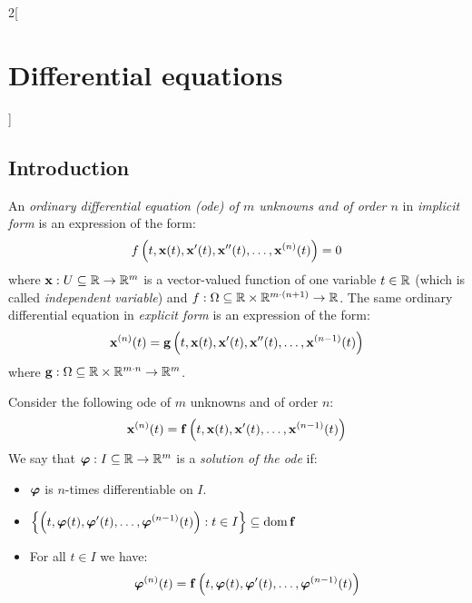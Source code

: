 \documentclass[../../../main.tex]{subfiles}
\begin{document}
\begin{multicols}{2}[\section{Differential equations}]
  \subsection{Introduction}
  \begin{definition}
    An \textit{ordinary differential equation (ode) of $m$ unknowns and of order $n$} in \textit{implicit form} is an expression of the form: $$f\left(t,\boldsymbol{\mathrm{x}}(t),\boldsymbol{\mathrm{x}}'(t),\boldsymbol{\mathrm{x}}''(t),\ldots,\boldsymbol{\mathrm{x}}^{(n)}(t)\right)=0$$
    where $\boldsymbol{\mathrm{x}}:U\subseteq\mathbb{R}\rightarrow\mathbb{R}^m$ is a vector-valued function of one variable $t\in\mathbb{R}$ (which is called \textit{independent variable}) and $f:\Omega\subseteq\mathbb{R}\times\mathbb{R}^{m\cdot(n+1)}\rightarrow\mathbb{R}$. The same ordinary differential equation in \textit{explicit form} is an expression of the form: $$\boldsymbol{\mathrm{x}}^{(n)}(t)=\boldsymbol{\mathrm{g}}\left(t,\boldsymbol{\mathrm{x}}(t),\boldsymbol{\mathrm{x}}'(t),\boldsymbol{\mathrm{x}}''(t),\ldots,\boldsymbol{\mathrm{x}}^{(n-1)}(t)\right)$$
    where $\boldsymbol{\mathrm{g}}:\Omega\subseteq\mathbb{R}\times\mathbb{R}^{m\cdot n}\rightarrow\mathbb{R}^m$.
  \end{definition}
  \begin{definition}
    Consider the following ode of $m$ unknowns and of order $n$:
    \begin{equation}\label{DE_ode1}
      \boldsymbol{\mathrm{x}}^{(n)}(t)=\boldsymbol{\mathrm{f}}\left(t,\boldsymbol{\mathrm{x}}(t),\boldsymbol{\mathrm{x}}'(t),\ldots,\boldsymbol{\mathrm{x}}^{(n-1)}(t)\right)
    \end{equation}
    We say that $\boldsymbol{\mathrm{\varphi}}:I\subseteq\mathbb{R}\rightarrow\mathbb{R}^m$ is a \textit{solution of the ode} if:
    \begin{itemize}
      \item $\boldsymbol{\mathrm{\varphi}}$ is $n$-times differentiable on $I$.
      \item $\displaystyle\left\{\left(t,\boldsymbol{\mathrm{\varphi}}(t),\boldsymbol{\mathrm{\varphi}}'(t),\ldots,\boldsymbol{\mathrm{\varphi}}^{(n-1)}(t)\right):t\in I\right\}\subseteq\operatorname{dom} \boldsymbol{\mathrm{f}}$
      \item For all $t\in I$ we have:
            $$\boldsymbol{\mathrm{\varphi}}^{(n)}(t)=\boldsymbol{\mathrm{f}}\left(t,\boldsymbol{\mathrm{\varphi}}(t),\boldsymbol{\mathrm{\varphi}}'(t),\ldots,\boldsymbol{\mathrm{\varphi}}^{(n-1)}(t)\right)$$

\end{itemize}
\end{definition}
\end{multicols}
\end{document}

